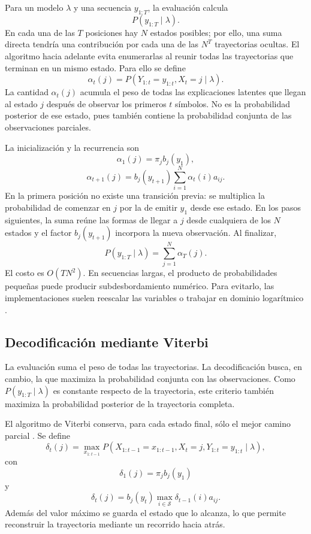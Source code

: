 Para un modelo $\lambda$ y una secuencia $y_{1:T}$, la evaluación calcula
\[
P(y_{1:T}\mid\lambda).
\]
En cada una de las $T$ posiciones hay $N$ estados posibles; por ello, una suma directa tendría una contribución por cada una de las $N^T$ trayectorias ocultas. El algoritmo hacia adelante evita enumerarlas al reunir todas las trayectorias que terminan en un mismo estado. Para ello se define
\[
\alpha_t(j)
=
P(Y_{1:t}=y_{1:t},X_t=j\mid\lambda).
\]
La cantidad $\alpha_t(j)$ acumula el peso de todas las explicaciones latentes que llegan al estado $j$ después de observar los primeros $t$ símbolos. No es la probabilidad posterior de ese estado, pues también contiene la probabilidad conjunta de las observaciones parciales.

La inicialización y la recurrencia son
\[
\alpha_1(j)=\pi_jb_j(y_1),
\]
\[
\alpha_{t+1}(j)
=
b_j(y_{t+1})\sum_{i=1}^{N}\alpha_t(i)a_{ij}.
\]
En la primera posición no existe una transición previa: se multiplica la probabilidad de comenzar en $j$ por la de emitir $y_1$ desde ese estado. En los pasos siguientes, la suma reúne las formas de llegar a $j$ desde cualquiera de los $N$ estados y el factor $b_j(y_{t+1})$ incorpora la nueva observación.
Al finalizar,
\[
P(y_{1:T}\mid\lambda)=\sum_{j=1}^{N}\alpha_T(j).
\]
El costo es $O(TN^2)$. En secuencias largas, el producto de probabilidades pequeñas puede producir subdesbordamiento numérico. Para evitarlo, las implementaciones suelen reescalar las variables o trabajar en dominio logarítmico \cite{rabiner1989,cappe2005}.

\subsection{Decodificación mediante Viterbi}

La evaluación suma el peso de todas las trayectorias. La decodificación busca, en cambio, la que maximiza la probabilidad conjunta con las observaciones. Como $P(y_{1:T}\mid\lambda)$ es constante respecto de la trayectoria, este criterio también maximiza la probabilidad posterior de la trayectoria completa.

El algoritmo de Viterbi conserva, para cada estado final, sólo el mejor camino parcial \cite{rabiner1989}. Se define
\[
\delta_t(j)
=
\max_{x_{1:t-1}}
P(X_{1:t-1}=x_{1:t-1},X_t=j,Y_{1:t}=y_{1:t}\mid\lambda),
\]
con
\[
\delta_1(j)=\pi_jb_j(y_1)
\]
y
\[
\delta_t(j)
=
b_j(y_t)\max_{i\in\mathcal{S}}\delta_{t-1}(i)a_{ij}.
\]
Además del valor máximo se guarda el estado que lo alcanza, lo que permite reconstruir la trayectoria mediante un recorrido hacia atrás.

